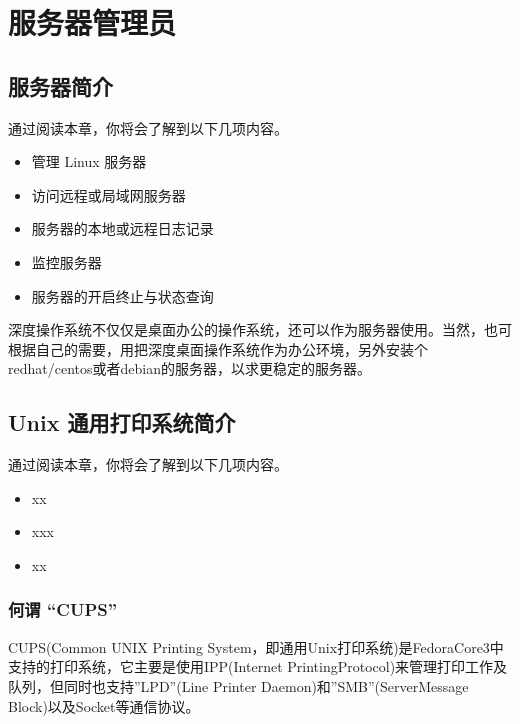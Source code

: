 \documentclass[doctor,openright,twoside]{sjtuthesis}
\newif\ifusepartquote
\newcommand{\thepartquote}{}
\newcommand{\thepartquoteauthor}{}
\newcommand{\partquote}[2]{\ifusepartquote\renewcommand{\thepartquote}{#1}\renewcommand{\thepartquoteauthor}{#2}\fi}
\newif\ifusepartintro
\newcommand{\thepartintro}{}
\newcommand{\partintro}[1]{\ifusepartintro\renewcommand{\thepartintro}{#1}\fi}
\providecommand{\tightlist}{%
    \setlength{\itemsep}{0pt}\setlength{\parskip}{0pt}}
\theoremstyle{plain}
\theoremstyle{definition}
\theoremstyle{remark}
\theoremstyle{ocrenumbox}
\theoremstyle{plain}
\begin{document}
\partquote{运筹帷幄之中，决胜千里之外}{刘邦}
\partintro{
在服务器领域，Linux 无愧于操作系统中的王者，本部分介绍几个常见服务器软件的安装使用维护的方法。
}

\hypertarget{part:server-admin}{%
\part{服务器管理员}\label{part:server-admin}}

\hypertarget{chap:server-intro}{%
\chapter{\texorpdfstring{服务器简介}{服务器简介}}\label{chap:server-intro}}

通过阅读本章，你将会了解到以下几项内容。

\begin{itemize}
\tightlist
\item
  管理 Linux 服务器
\item
  访问远程或局域网服务器
\item
  服务器的本地或远程日志记录
\item
  监控服务器
\item
  服务器的开启终止与状态查询
\end{itemize}

深度操作系统不仅仅是桌面办公的操作系统，还可以作为服务器使用。当然，也可根据自己的需要，用把深度桌面操作系统作为办公环境，另外安装个redhat/centos或者debian的服务器，以求更稳定的服务器。

\hypertarget{chap:cups}{%
\chapter{Unix 通用打印系统简介}\label{chap:cups}}

通过阅读本章，你将会了解到以下几项内容。

\begin{itemize}
\tightlist
\item
  xx
\item
  xxx
\item
  xx
\end{itemize}

\hypertarget{cups}{%
\section{何谓 ``CUPS''}\label{cups}}

CUPS(Common UNIX Printing System，即通用Unix打印系统)是FedoraCore3中支持的打印系统，它主要是使用IPP(Internet PrintingProtocol)来管理打印工作及队列，但同时也支持''LPD''(Line Printer Daemon)和''SMB''(ServerMessage Block)以及Socket等通信协议。
\end{document}
